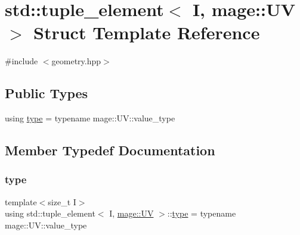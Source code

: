 \hypertarget{structstd_1_1tuple__element_3_01_i_00_01mage_1_1_u_v_01_4}{}\section{std\+:\+:tuple\+\_\+element$<$ I, mage\+:\+:UV $>$ Struct Template Reference}
\label{structstd_1_1tuple__element_3_01_i_00_01mage_1_1_u_v_01_4}


{\ttfamily \#include $<$geometry.\+hpp$>$}

\subsection*{Public Types}
\begin{DoxyCompactItemize}
\item 
using \mbox{\hyperlink{structstd_1_1tuple__element_3_01_i_00_01mage_1_1_u_v_01_4_a793980eda890cb8bc5540464e975fbe4}{type}} = typename mage\+::\+U\+V\+::value\+\_\+type
\end{DoxyCompactItemize}


\subsection{Member Typedef Documentation}
\mbox{\label{structstd_1_1tuple__element_3_01_i_00_01mage_1_1_u_v_01_4_a793980eda890cb8bc5540464e975fbe4}} 
\subsubsection{\texorpdfstring{type}{type}}
{\footnotesize\ttfamily template$<$size\+\_\+t I$>$ \\
using std\+::tuple\+\_\+element$<$ I, \mbox{\hyperlink{structmage_1_1_u_v}{mage\+::\+UV}} $>$\+::\mbox{\hyperlink{structstd_1_1tuple__element_3_01_i_00_01mage_1_1_u_v_01_4_a793980eda890cb8bc5540464e975fbe4}{type}} =  typename mage\+::\+U\+V\+::value\+\_\+type}

